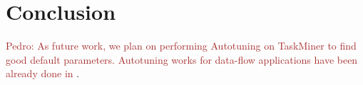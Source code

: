 \documentclass[sigplan,10pt,review,anonymous]{acmart}
\newcommand{\pedro}[1]{\noindent\textcolor{brown}{Pedro: {#1}}}
\newcommand{\pedro}[1]{}
\newcommand\Taskminer{\mbox{\textsf{TaskMiner}}}
\begin{document}

\section{Conclusion}
\label{sec:conc}

\pedro{As future work, we plan on performing Autotuning on {\Taskminer} to find good default parameters.
Autotuning works for data-flow applications have been already done in \cite{Trancoso17, Emani15}}.


\end{document}
